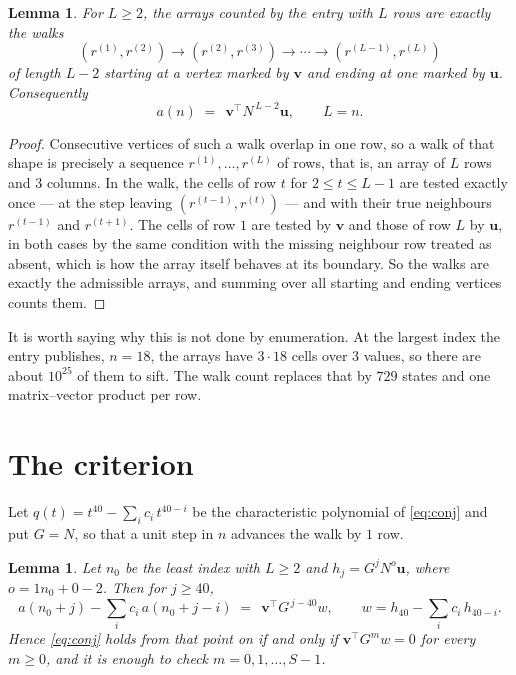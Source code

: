 \documentclass[11pt,a4paper]{article}
\theoremstyle{plain}
\newtheorem{lemma}[theorem]{Lemma}
\theoremstyle{definition}
\begin{document}
\begin{lemma}\label{lem:walk}
For $L\ge2$, the arrays counted by the entry with $L$ rows are exactly the walks
\[
(r^{(1)},r^{(2)})\to(r^{(2)},r^{(3)})\to\cdots\to(r^{(L-1)},r^{(L)})
\]
of length $L-2$ starting at a vertex marked by $\mathbf{v}$ and ending at one marked by
$\mathbf{u}$. Consequently
\[
a(n)\;=\;\,\mathbf{v}^{\!\top}N^{\,L-2}\mathbf{u},\qquad L=n .
\]
\end{lemma}

\begin{proof}
Consecutive vertices of such a walk overlap in one row, so a walk of that shape is
precisely a sequence $r^{(1)},\dots,r^{(L)}$ of rows, that is, an array of $L$ rows
and $3$ columns. In the walk, the cells of row $t$ for $2\le t\le L-1$ are tested
exactly once --- at the step leaving $(r^{(t-1)},r^{(t)})$ --- and with their true
neighbours $r^{(t-1)}$ and $r^{(t+1)}$. The cells of row $1$ are tested by
$\mathbf{v}$ and those of row $L$ by $\mathbf{u}$, in both cases by the same condition
with the missing neighbour row treated as absent, which is how the array itself behaves at
its boundary. So the walks are exactly the admissible arrays, and summing over all starting
and ending vertices counts them.
\end{proof}


It is worth saying why this is not done by enumeration. At the largest index the entry
publishes, $n=18$, the arrays have $3\cdot18$ cells over
$3$ values, so there are about $10^{25}$ of them to sift. The
walk count replaces that by $729$ states and one matrix--vector product per row.
\section{The criterion}

Let $q(t)=t^{40}-\sum_i c_i\,t^{40-i}$ be the characteristic polynomial of
\eqref{eq:conj} and put $G=N$, so that a unit step in $n$ advances the walk by
$1$ row.

\begin{lemma}\label{lem:crit}
Let $n_0$ be the least index with $L\ge2$ and $h_j=G^{j}N^{o}\mathbf{u}$, where
$o=1n_0+0-2$. Then for $j\ge40$,
\[
a(n_0+j)-\sum_i c_i\,a(n_0+j-i)\;=\;\,\mathbf{v}^{\!\top}G^{\,j-40}w,
\qquad w=h_{40}-\sum_i c_i\,h_{40-i} .
\]
Hence \eqref{eq:conj} holds from that point on if and only if
$\mathbf{v}^{\!\top}G^{m}w=0$ for every $m\ge0$, and it is enough to check
$m=0,1,\dots,S-1$.
\end{lemma}
\end{document}
